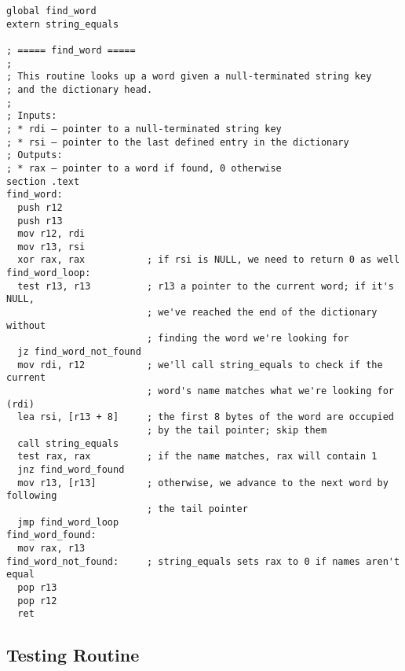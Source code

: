 \documentclass[12pt,a4paper]{report}
\begin{document}
\begin{lstlisting}[basicstyle=\scriptsize]
global find_word
extern string_equals

; ===== find_word =====
;
; This routine looks up a word given a null-terminated string key
; and the dictionary head.
;
; Inputs:
; * rdi — pointer to a null-terminated string key
; * rsi — pointer to the last defined entry in the dictionary
; Outputs:
; * rax — pointer to a word if found, 0 otherwise
section .text
find_word:
  push r12
  push r13
  mov r12, rdi
  mov r13, rsi
  xor rax, rax           ; if rsi is NULL, we need to return 0 as well
find_word_loop:
  test r13, r13          ; r13 a pointer to the current word; if it's NULL,
                         ; we've reached the end of the dictionary without
                         ; finding the word we're looking for
  jz find_word_not_found
  mov rdi, r12           ; we'll call string_equals to check if the current
                         ; word's name matches what we're looking for (rdi)
  lea rsi, [r13 + 8]     ; the first 8 bytes of the word are occupied
                         ; by the tail pointer; skip them
  call string_equals
  test rax, rax          ; if the name matches, rax will contain 1
  jnz find_word_found
  mov r13, [r13]         ; otherwise, we advance to the next word by following
                         ; the tail pointer
  jmp find_word_loop
find_word_found:
  mov rax, r13
find_word_not_found:     ; string_equals sets rax to 0 if names aren't equal
  pop r13
  pop r12
  ret
\end{lstlisting}

\subsection*{Testing Routine}
\end{document}
